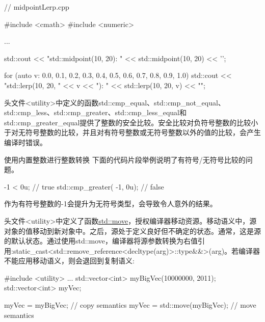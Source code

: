 \begin{cpp}
// midpointLerp.cpp

#include <cmath>
#include <numeric>

...

std::cout << "std::midpoint(10, 20): " << std::midpoint(10, 20) << '\n';

for (auto v: {0.0, 0.1, 0.2, 0.3, 0.4, 0.5, 0.6, 0.7, 0.8, 0.9, 1.0}) {
	std::cout << "std::lerp(10, 20, " << v << "): " << std::lerp(10, 20, v) << "\n";
}
\end{cpp}





头文件<utility>中定义的函数std::cmp\_equal、std::cmp\_not\_equal、std::cmp\_less、std::cmp\_greater、std::cmp\_less\_equal和std::cmp\_greater\_equal提供了整数的安全比较。安全比较对负符号整数的比较小于对无符号整数的比较，并且对有符号整数或无符号整数以外的值的比较，会产生编译时错误。


\begin{myWarning}{使用内置整数进行整数转换}
下面的代码片段举例说明了有符号/无符号比较的问题。

\begin{cpp}
-1 < 0u; // true
std::cmp_greater( -1, 0u); // false
\end{cpp}

作为有符号整数的-1会提升为无符号类型，会导致令人意外的结果。

\end{myWarning}


头文件<utility>中定义了函数\href{http://en.cppreference.com/w/cpp/utility/move}{std::move}，授权编译器移动资源。移动语义中，源对象的值移动到新对象中。之后，源处于定义良好但不确定的状态。通常，这是源的默认状态。通过使用std::move，编译器将源参数转换为右值引用:static\_cast<std::remove\_reference<decltype(arg)>::type\&\&>(arg)。若编译器不能应用移动语义，则会退回到复制语义:

\begin{cpp}
#include <utility>
...
std::vector<int> myBigVec(10000000, 2011);
std::vector<int> myVec;

myVec = myBigVec; // copy semantics
myVec = std::move(myBigVec); // move semantics
\end{cpp}


